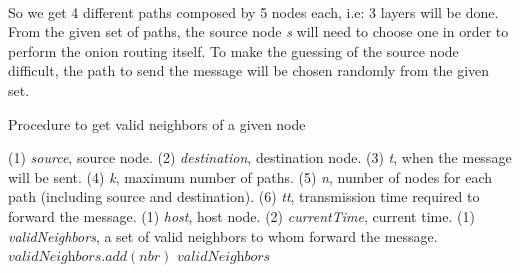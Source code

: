 \noindent{}\\

So we get 4 different paths composed by 5 nodes each, i.e: 3 layers will be done. From the given set of paths, the source node \textit{s} will need to choose one in order to perform the onion routing itself. To make the guessing of the source node difficult, the path to send the message will be chosen randomly from the given set.

\begin{algorithm}
\caption{Procedure to get valid neighbors of a given node}
\label{alg:get-neighbors}
\begin{algorithmic}[1]
\INHERIT (1) \textit{source}, source node. (2) \textit{destination}, destination node. (3) \textit{t}, when the message will be sent. (4) \textit{k}, maximum number of paths. (5) \textit{n}, number of nodes for each path (including source and destination). (6) \textit{tt}, transmission time required to forward the message.
\INPUT (1) \textit{host}, host node. (2) \textit{currentTime}, current time.
\OUTPUT (1) \textit{validNeighbors}, a set of valid neighbors to whom forward the message.
		\State $\textit{validNeighbors}.add(\textit{nbr})$
	\EndIf
\EndFor
\State \Return $\textit{validNeighbors}$
\EndProcedure
\end{algorithmic}
\end{algorithm}


